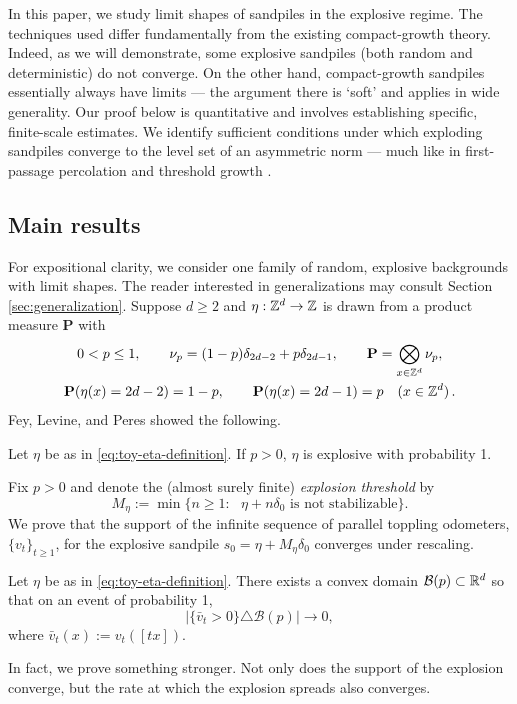 \documentclass[12pt]{amsart}
\begin{document}
In this paper, we study limit shapes of sandpiles in the explosive regime. The techniques used differ fundamentally from the existing compact-growth theory. Indeed, as we will demonstrate, some explosive sandpiles (both random and deterministic) do not converge. On the other hand, compact-growth sandpiles essentially always have limits --- the argument there is `soft' and applies in wide generality. Our proof below is quantitative and involves establishing specific, finite-scale estimates. We identify sufficient conditions under which exploding sandpiles converge to the level set of an asymmetric norm  --- much like in first-passage percolation  \cite{cox1981some} and threshold growth \cite{willson1978convergence, gravner1993threshold}.


\subsection{Main results}	
For expositional clarity, we consider one family of random, explosive backgrounds with limit shapes. The reader interested in generalizations may consult Section \ref{sec:generalization}. Suppose $d \geq 2$ and $\eta:\mathbb{Z}^d \to \mathbb{Z}$ is drawn from a product measure $\mathbf{P}$ with
\begin{equation}\label{eq:toy-eta-definition}
\begin{gathered}
0<p\leq1,\qquad
\nu_p=(1-p)\delta_{2d-2}+p\delta_{2d-1},\qquad
\mathbf P=\bigotimes_{x\in\mathbb{Z}^d}\nu_p,\\
\mathbf P(\eta(x)=2d-2)=1-p,\qquad
\mathbf P(\eta(x)=2d-1)=p\quad(x\in\mathbb{Z}^d)\,.
\end{gathered}
\end{equation}
Fey, Levine, and Peres showed the following.
\begin{theorem}\label{prop:fey_levine_peres_explode}
	Let $\eta$ be as in \eqref{eq:toy-eta-definition}.  If $p > 0$, $\eta$ is explosive with probability 1. 
\end{theorem}
Fix $p > 0$ and denote the (almost surely finite) {\it explosion threshold} by
\begin{equation} \label{eq:first_explosion}
M_{\eta} :=  \min\{ n \geq 1 : \mbox{ $\eta + n  \delta_0$ is not stabilizable} \}. 
\end{equation} 
We prove that the support of the infinite sequence of parallel toppling odometers, $\{v_t\}_{t \geq 1}$, for the explosive sandpile $s_0 = \eta + M_{\eta}  \delta_0$ converges under rescaling. 
\begin{theorem} \label{theorem:limit_shape}
	Let $\eta$ be as in \eqref{eq:toy-eta-definition}. 
	There exists a convex domain $\mathcal{B}(p) \subset \mathbb{R}^d$ so that on an event of 
	probability 1, 
	\[
	| \{ \bar{v}_t > 0\} \triangle \mathcal{B}(p)| \to 0, 
	\]
	where $\bar{v}_t(x) := v_t([t x])$. 
\end{theorem}
In fact, we prove something stronger. Not only does the support of the explosion converge, 
but the rate at which the explosion spreads also converges. 
\end{document}

